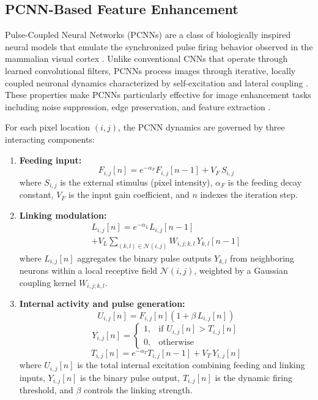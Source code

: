 \documentclass[twocolumn,iicol,pdflatex,sn-mathphys-num]{sn-jnl}%
\begin{document}
\subsection{PCNN-Based Feature Enhancement}
Pulse-Coupled Neural Networks (PCNNs) are a class of biologically inspired neural models that emulate the synchronized pulse firing behavior observed in the mammalian visual cortex \cite{4305279,6338347}. Unlike conventional CNNs that operate through learned convolutional filters, PCNNs process images through iterative, locally coupled neuronal dynamics characterized by self-excitation and lateral coupling \cite{10341267}. These properties make PCNNs particularly effective for image enhancement tasks including noise suppression, edge preservation, and feature extraction \cite{10848019}.

For each pixel location $(i, j)$, the PCNN dynamics are governed by three interacting components:

\begin{enumerate}
	\item \textbf{Feeding input:}
	\begin{equation}
		F_{i,j}[n] = e^{-\alpha_{F}} F_{i,j}[n - 1] + V_{F} \, S_{i,j}
	\end{equation}
	where $S_{i,j}$ is the external stimulus (pixel intensity), $\alpha_F$ is the feeding decay constant, $V_F$ is the input gain coefficient, and $n$ indexes the iteration step.
	
	\item \textbf{Linking modulation:}
	\begin{multline}
		L_{i,j}[n] = e^{-\alpha_L} L_{i,j}[n-1] \\
		+ V_L \sum_{(k,l) \in \mathcal{N}(i,j)} W_{i,j;k,l} \, Y_{k,l}[n-1]
	\end{multline}
	where $L_{i,j}[n]$ aggregates the binary pulse outputs $Y_{k,l}$ from neighboring neurons within a local receptive field $\mathcal{N}(i,j)$, weighted by a Gaussian coupling kernel $W_{i,j;k,l}$.
	
	\item \textbf{Internal activity and pulse generation:}
	\begin{equation}
		U_{i,j}[n] = F_{i,j}[n] \left(1 + \beta \, L_{i,j}[n]\right)
	\end{equation}
	\begin{equation}
		Y_{i,j}[n] = 
		\begin{cases} 
			1, & \text{if } U_{i,j}[n] > T_{i,j}[n] \\
			0, & \text{otherwise}
		\end{cases}
	\end{equation}
	\begin{equation}
		T_{i,j}[n] = e^{-\alpha_T} T_{i,j}[n-1] + V_T \, Y_{i,j}[n]
	\end{equation}
	where $U_{i,j}[n]$ is the total internal excitation combining feeding and linking inputs, $Y_{i,j}[n]$ is the binary pulse output, $T_{i,j}[n]$ is the dynamic firing threshold, and $\beta$ controls the linking strength.
\end{enumerate}
\end{document}
